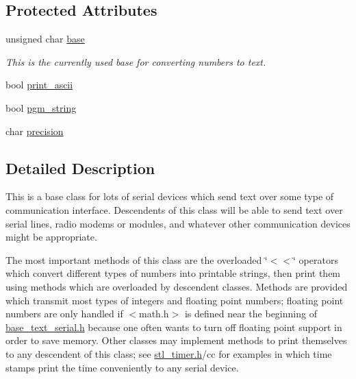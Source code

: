 \subsection*{Protected Attributes}
\begin{DoxyCompactItemize}
\item 
\hypertarget{classbase__text__serial_a8f253aae58f8897edee505b4118afed0}{unsigned char \hyperlink{classbase__text__serial_a8f253aae58f8897edee505b4118afed0}{base}}\label{classbase__text__serial_a8f253aae58f8897edee505b4118afed0}

\begin{DoxyCompactList}\small\item\em This is the currently used base for converting numbers to text. \end{DoxyCompactList}\item 
bool \hyperlink{classbase__text__serial_acf570e2dd8b2f818f2728c22945f1955}{print\-\_\-ascii}
\item 
bool \hyperlink{classbase__text__serial_a613572e10c2d70d44bdb44c451f6fc6b}{pgm\-\_\-string}
\item 
char \hyperlink{classbase__text__serial_a0927f9b976981a7f38a4445083ec6f34}{precision}
\end{DoxyCompactItemize}


\subsection{Detailed Description}
This is a base class for lots of serial devices which send text over some type of communication interface. Descendents of this class will be able to send text over serial lines, radio modems or modules, and whatever other communication devices might be appropriate.

The most important methods of this class are the overloaded \char`\"{}$<$$<$\char`\"{} operators which convert different types of numbers into printable strings, then print them using methods which are overloaded by descendent classes. Methods are provided which transmit most types of integers and floating point numbers; floating point numbers are only handled if $<$math.\-h$>$ is defined near the beginning of \hyperlink{base__text__serial_8h}{base\-\_\-text\-\_\-serial.\-h} because one often wants to turn off floating point support in order to save memory. Other classes may implement methods to print themselves to any descendent of this class; see \hyperlink{stl__timer_8h}{stl\-\_\-timer.\-h}/cc for examples in which time stamps print the time conveniently to any serial device.

